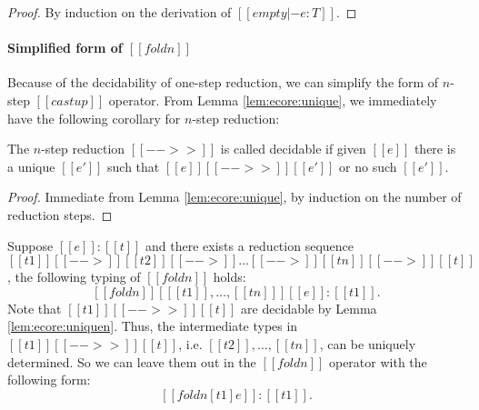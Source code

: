 \begin{proof}
    By induction on the derivation of $[[empty |- e:T]]$.
\end{proof}

\paragraph{Simplified form of $[[foldn]]$}
Because of the decidability of one-step reduction, we can simplify the form of 
$n$-step $[[castup]]$ operator. From Lemma \ref{lem:ecore:unique}, 
we immediately have the following corollary for $n$-step reduction:

\begin{lem}\label{lem:ecore:uniquen}
    The $n$-step reduction $[[-->>]]$ is called decidable if 
    given $[[e]]$ there is a unique $[[e']]$ such that $[[e]] [[-->>]] [[e']]$ or no such $[[e']]$.
\end{lem}

\begin{proof}
    Immediate from Lemma \ref{lem:ecore:unique}, by induction on the number of
reduction steps.
\end{proof}

Suppose $[[e]] : [[t]]$ and there exists a reduction sequence
$[[t1]] [[-->]] [[t2]] [[-->]] \dots [[-->]] [[tn]] [[-->]] [[t]]$,
the following typing of $[[foldn]]$ holds:
\[
    [[foldn]] [ [[t1]], \dots, [[tn]] ] [[e]] : [[t1]].
\]
Note that $[[t1]] [[-->>]] [[t]]$ are decidable by Lemma
\ref{lem:ecore:uniquen}. Thus, the intermediate types in $[[t1]] [[-->>]] [[t]]$,
i.e. $[[t2]], \dots, [[tn]]$, can be uniquely determined. So we can leave
them out in the $[[foldn]]$ operator with the following form:
\[
    [[foldn [t1] e]] : [[t1]].
\]
